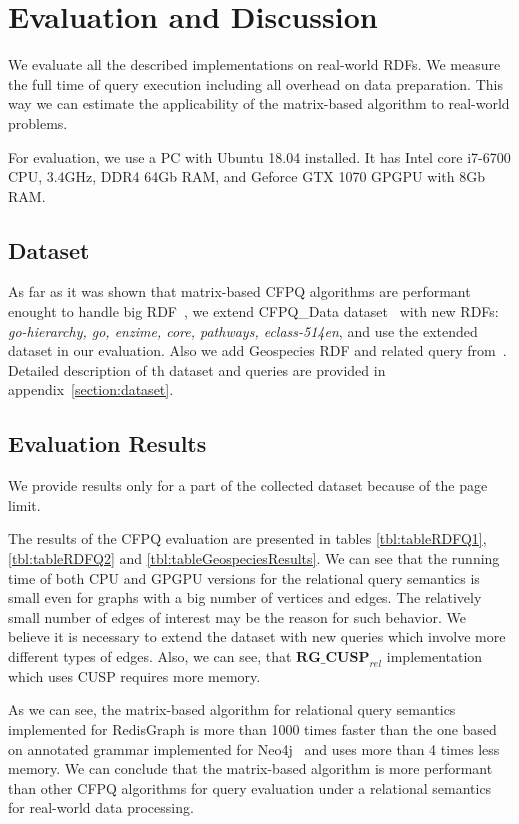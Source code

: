 \section{Evaluation and Discussion}

We evaluate all the described implementations on real-world RDFs.
We measure the full time of query execution including all overhead on data preparation.
This way we can estimate the applicability of the matrix-based algorithm to real-world problems.

For evaluation, we use a PC with Ubuntu 18.04 installed.
It has Intel core i7-6700 CPU, 3.4GHz, DDR4 64Gb RAM, and Geforce GTX 1070 GPGPU with 8Gb RAM.

\subsection{Dataset}
As far as it was shown that matrix-based CFPQ algorithms are performant enought to handle big RDF~\cite{Mishin:2019:ECP:3327964.3328503}, we extend CFPQ\_Data dataset~\cite{Mishin:2019:ECP:3327964.3328503} with new RDFs: \textit{go-hierarchy, go, enzime, core, pathways, eclass-514en}, and use the extended dataset in our evaluation. Also we add Geospecies RDF and related query from~\cite{Kuijpers:2019:ESC:3335783.3335791}. 
Detailed description of th dataset and queries are provided in appendix~\ref{section:dataset}.


\subsection{Evaluation Results}
We provide results only for a part of the collected dataset because of the page limit.

The results of the CFPQ evaluation are presented in tables \ref{tbl:tableRDFQ1}, \ref{tbl:tableRDFQ2} and \ref{tbl:tableGeospeciesResults}.
We can see that the running time of both CPU and GPGPU versions for the relational query semantics is small even for graphs with a big number of vertices and edges.
The relatively small number of edges of interest may be the reason for such behavior.
We believe it is necessary to extend the dataset with new queries which involve more different types of edges.
Also, we can see, that $\textbf{RG\_CUSP}_{\textit{rel}}$ implementation which uses CUSP requires more memory.

As we can see, the matrix-based algorithm for relational query semantics implemented for RedisGraph is more than 1000 times faster than the one based on annotated grammar implemented for Neo4j~\cite{Kuijpers:2019:ESC:3335783.3335791} and uses more than 4 times less memory.
We can conclude that the matrix-based algorithm is more performant than other CFPQ algorithms for query evaluation under a relational semantics for real-world data processing.


